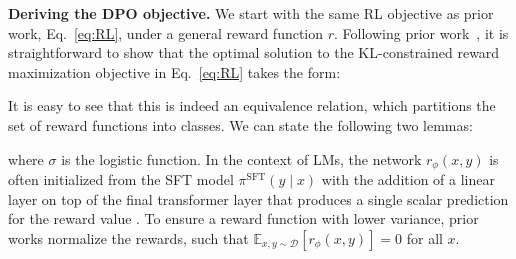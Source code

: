 \textbf{Deriving the DPO objective.} We start with the same RL objective as prior work, Eq.~\ref{eq:RL}, under a general reward function $r$. Following prior work~\citep{peters2007reinforcement, peng2019advantage, korbak2022reinforcement, go2023aligning}, it is straightforward to show that the optimal solution to the KL-constrained reward maximization objective in Eq.~\ref{eq:RL} takes the form:

It is easy to see that this is indeed an equivalence relation, which partitions the set of reward functions into classes. We can state the following two lemmas:

where $\sigma$ is the logistic function. In the context of LMs, the network $r_{\phi}(x, y)$ is often initialized from the SFT model $\pi^\text{SFT}(y \mid x)$ with the addition of a linear layer on top of the final transformer layer that produces a single scalar prediction for the reward value \cite{ziegler2020finetuning}. To ensure a reward function with lower variance, prior works normalize the rewards, such that  $\mathbb{E}_{x,y\sim \mathcal{D}}\left[r_\phi(x, y)\right] = 0$ for all $x$.

